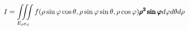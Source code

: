 \begin{multicols}{3}
        \begin{equation}
          I = \iiint \limits_{E_{\rho \theta \varphi}}
            f(\rho \sin \varphi \cos \theta,
              \rho \sin \varphi \sin \theta,
              \rho \cos \varphi
            ) \pmb{\rho^{2} \sin \varphi}
            d \varphi d \theta d \rho
        \end{equation}

\end{multicols}